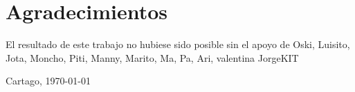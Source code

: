 \chapter*{Agradecimientos}
\thispagestyle{empty}

El resultado de este trabajo no hubiese sido posible sin el apoyo de Oski, Luisito, Jota, Moncho, Piti, Manny, Marito, Ma, Pa, Ari, valentina JorgeKIT

\vspace*{1cm}

\scriptAuthor

Cartago, \today

\cleardoublepage

